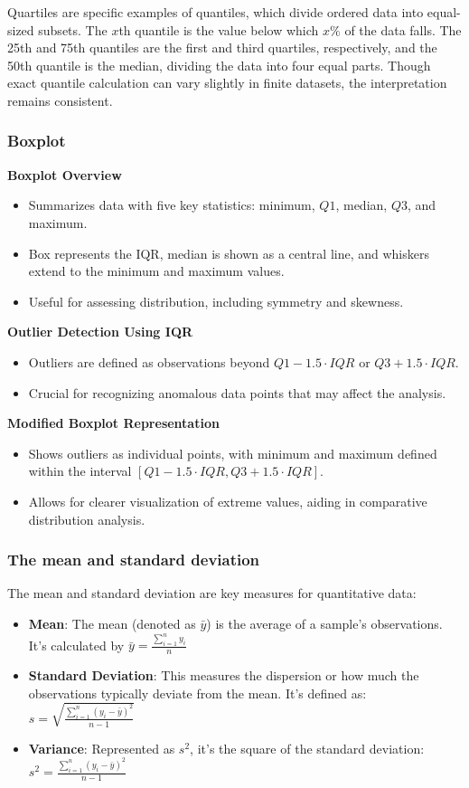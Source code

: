 \documentclass{article}
\begin{document}
Quartiles are specific examples of quantiles, which divide ordered data into equal-sized subsets. The $x$th quantile is the value below which $x\%$ of the data falls.  The 25th and 75th quantiles are the first and third quartiles, respectively, and the 50th quantile is the median, dividing the data into four equal parts. Though exact quantile calculation can vary slightly in finite datasets, the interpretation remains consistent.

\subsubsection{Boxplot}
\textbf{Boxplot Overview}
\begin{itemize}
    \item Summarizes data with five key statistics: minimum, $Q1$, median, $Q3$, and maximum.
    \item Box represents the IQR, median is shown as a central line, and whiskers extend to the minimum and maximum values.
    \item Useful for assessing distribution, including symmetry and skewness.
\end{itemize}

\textbf{Outlier Detection Using IQR}
\begin{itemize}
    \item Outliers are defined as observations beyond $Q1 - 1.5 \cdot IQR$ or $Q3 + 1.5 \cdot IQR$.
    \item Crucial for recognizing anomalous data points that may affect the analysis.
\end{itemize}

\textbf{Modified Boxplot Representation}
\begin{itemize}
    \item Shows outliers as individual points, with minimum and maximum defined within the interval $[Q1 - 1.5 \cdot IQR, Q3 + 1.5 \cdot IQR]$.
    \item Allows for clearer visualization of extreme values, aiding in comparative distribution analysis.
\end{itemize}

\subsubsection{The mean and standard deviation}
The mean and standard deviation are key measures for quantitative data:

\begin{itemize}
    \item \textbf{Mean}: The mean (denoted as $\bar{y}$) is the average of a sample's observations. It's calculated by $\bar{y}=\frac{\sum_{i=1}^{n} {y_i}}{n}$ 
    \item \textbf{Standard Deviation}:  This measures the dispersion or how much the observations typically deviate from the mean.
    It's defined as: $s=\sqrt{\frac{\sum_{i=1}^{n} ({y_i-\bar{y}})^2}{n-1}}$
    \item \textbf{Variance}: Represented as $s^2$, it's the square of the standard deviation: $s^2=\frac{\sum_{i=1}^{n} ({y_i-\bar{y}})^2}{n-1}$
\end{itemize}
\end{document}
